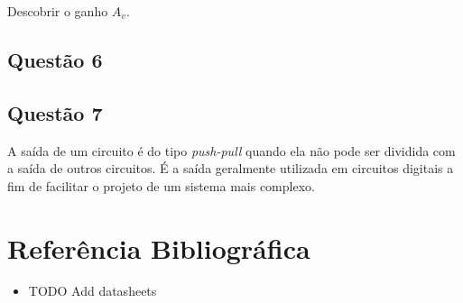 \documentclass[12pt, a4paper, twoside]{article}
\begin{document}
Descobrir o ganho $A_v$.

\subsection{Questão 6}


\subsection{Questão 7}

A saída de um circuito é do tipo \textit{push-pull} quando ela não pode ser dividida com a saída de outros circuitos. É a saída geralmente utilizada em circuitos digitais a fim de facilitar o projeto de um sistema mais complexo.

\section{Referência Bibliográfica}

\begin{itemize}
    \item TODO Add datasheets
\end{itemize}
\end{document}

